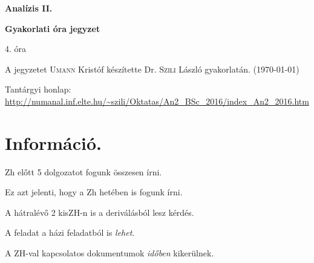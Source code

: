\documentclass[a4paper,11.5pt]{article}
\begin{document}
	\setlength\parindent{0pt}
	\def\s{\hspace{0.2mm}\vphantom{\beta}}
	\def\Z{\mathbb{Z}}
	\def\Q{\mathbb{Q}}
	\def\R{\mathbb{R}}
	\def\C{\mathbb{C}}
	\def\N{\mathbb{N}}
	\def\Rn{\mathbb{R}^{n}}
	\def\Ra{\overline{\mathbb{R}}}
	\def\sume{\displaystyle\sum_{n=1}^{+\infty}}
	\def\sumn{\displaystyle\sum_{n=0}^{+\infty}}
	\def\biz{\emph{Bizonyítás:\ }}
	\def\narrow{\underset{n\rightarrow+\infty}{\longrightarrow}}
	\def\limn{\displaystyle\lim_{n\to +\infty}}
	\def\limx{\displaystyle\lim_{x\to +\infty}}
	
	\theoremstyle{definition}
	\newtheorem{theorem}{Tétel}[subsection] %
	
	\theoremstyle{definition}
	\newtheorem{definition}[theorem]{Definíció} %
	\newtheorem{example}[theorem]{Példa} %
	\newtheorem{task}[theorem]{Feladat} %
	\newtheorem{note}[theorem]{Megjegyzés} %
	\newtheorem{revision}[theorem]{Emlékeztető} %
	\begin{center}
		{\LARGE \textbf{Analízis II.}}
		
		{\large \textbf{Gyakorlati óra jegyzet}}
		
		4. óra
	\end{center}
	A jegyzetet \textsc{Umann} Kristóf készítette Dr. \textsc{Szili} László gyakorlatán. (\today)
	
	Tantárgyi honlap: \url{http://numanal.inf.elte.hu/~szili/Oktatas/An2_BSc_2016/index_An2_2016.htm}
	
	\section{Információ.}
	\begin{compactitem}
		\item Zh előtt 5 dolgozatot fogunk összesen írni. 
		\item Ez azt jelenti, hogy a Zh hetében is fogunk írni.
		\item A hátralévő 2 kisZH-n is a deriválásból lesz kérdés.
		\item A feladat a házi feladatból is \textit{lehet}.
		\item A ZH-val kapcsolatos dokumentumok \textit{időben} kikerülnek.
	\end{compactitem}
\end{document}
